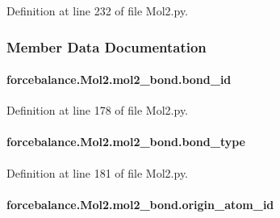 Definition at line 232 of file Mol2.\-py.



\subsubsection{Member Data Documentation}
\hypertarget{classforcebalance_1_1Mol2_1_1mol2__bond_a4beddc1bfbe7a937e6c50574320c3c6e}{
\paragraph[{bond\-\_\-id}]{\setlength{\rightskip}{0pt plus 5cm}forcebalance.\-Mol2.\-mol2\-\_\-bond.\-bond\-\_\-id}}\label{classforcebalance_1_1Mol2_1_1mol2__bond_a4beddc1bfbe7a937e6c50574320c3c6e}


Definition at line 178 of file Mol2.\-py.

\hypertarget{classforcebalance_1_1Mol2_1_1mol2__bond_af9fe955c88cbf454863d50c871d3bd67}{
\paragraph[{bond\-\_\-type}]{\setlength{\rightskip}{0pt plus 5cm}forcebalance.\-Mol2.\-mol2\-\_\-bond.\-bond\-\_\-type}}\label{classforcebalance_1_1Mol2_1_1mol2__bond_af9fe955c88cbf454863d50c871d3bd67}


Definition at line 181 of file Mol2.\-py.

\hypertarget{classforcebalance_1_1Mol2_1_1mol2__bond_ae24bf013368c83923716d78ae6e393b1}{
\paragraph[{origin\-\_\-atom\-\_\-id}]{\setlength{\rightskip}{0pt plus 5cm}forcebalance.\-Mol2.\-mol2\-\_\-bond.\-origin\-\_\-atom\-\_\-id}}\label{classforcebalance_1_1Mol2_1_1mol2__bond_ae24bf013368c83923716d78ae6e393b1}


